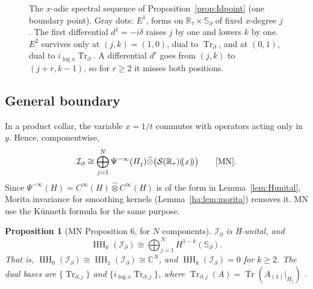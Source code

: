 \documentclass[11pt,oneside,reqno]{article}
\DeclareMathOperator{\HH}{HH}
\DeclareMathOperator{\Tr}{Tr}
\newcommand{\C}{\mathbb C}
\newcommand{\R}{\mathbb R}
\newcommand{\cS}{\mathcal S}
\newcommand{\Id}{\mathcal I_\partial}
\newcommand{\Trd}{\Tr_\partial}
\newcommand{\bTr}{\overline{\Tr}}
\newcommand{\CI}{C^\infty}
\newcommand{\Sd}{\mathbb S_\partial}
\newcommand{\lx}{\log x}
\theoremstyle{plain}
\newtheorem{proposition}[theorem]{Proposition}
\theoremstyle{definition}
\theoremstyle{remark}
\newcommand{\Lser}[1]{(\!(#1)\!)}
\begin{document}
\begin{figure}[htbp]
\centering
{}
\caption[The \(x\)-adic spectral sequence for \(\Id\)]{The \(x\)-adic
spectral sequence of Proposition~\ref{prop:Idpoint} (one boundary point).
Gray dots: \(E^1\), forms on \(\R_\tau\times\Sd\) of fixed \(x\)-degree
\(j\). The first differential \(d^1=-i\delta\) raises \(j\) by one and
lowers \(k\) by one. \(E^2\) survives only at \((j,k)=(1,0)\), dual to
\(\Trd\), and at \((0,1)\), dual to \(i_{\lx}\Trd\). A differential
\(d^r\) goes from \((j,k)\) to \((j+r,k-1)\), so for \(r\ge2\) it misses
both positions.}
\label{fig:ssId}
\end{figure}

\subsection{General boundary}\label{subsec:Idgeneral}
In a product collar, the variable \(x=1/t\) commutes with operators acting
only in \(y\). Hence, componentwise,
\[
 \Id\cong\bigoplus_{j=1}^N\Psi^{-\infty}(H_j)\widehat\otimes
 \bigl(\cS(\R_\tau)\Lser{x}\bigr)\qquad\text{\cite[p.~16]{MN}}.
\]
Since \(\Psi^{-\infty}(H)=\CI(H)\widehat\otimes\CI(H)\) is of the form
in Lemma~\ref{lem:Hunital}, Morita invariance for smoothing kernels
(Lemma~\ref{ha:lem:morita}) removes it. MN use the Künneth formula
\cite{Karoubi} for the same purpose.

\begin{proposition}[MN Proposition 6, for \(N\) components]\label{prop:Id}
\(\Id\) is H-unital, and
\[
 \HH_k(\Id)\cong\bigoplus_{j=1}^NH^{1-k}(\Sd).
\]
That is, \(\HH_0(\Id)\cong\HH_1(\Id)\cong\C^N\), and
\(\HH_k(\Id)=0\) for \(k\ge2\). The dual bases are
\(\{\Tr_{\partial,j}\}\) and \(\{i_{\lx}\Tr_{\partial,j}\}\), where
\(\Tr_{\partial,j}(A)=\bTr(A_{(1)}|_{H_j})\) \cite[Lemma~10]{MN}.
\end{proposition}
\end{document}

